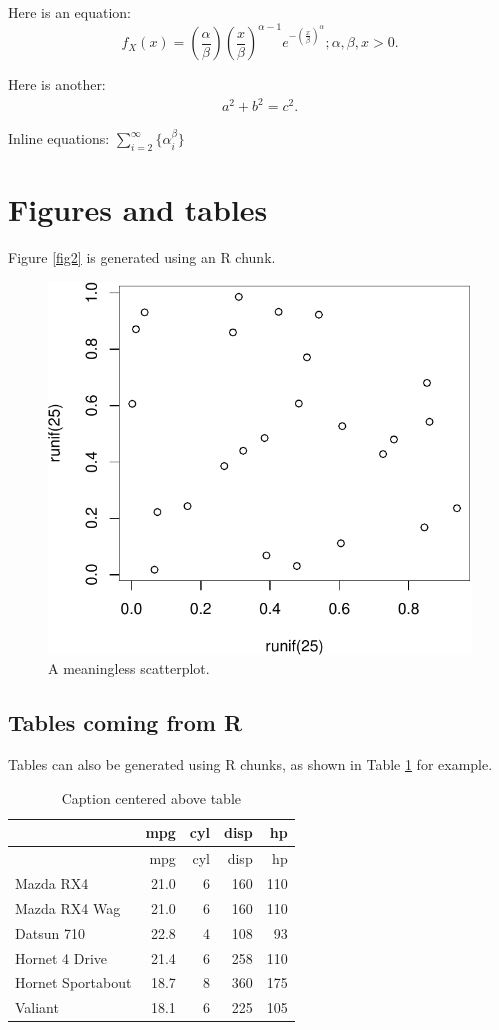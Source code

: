 \documentclass[preprint, 3p,
authoryear]{elsarticle} %
\begin{document}
Here is an equation: \[ 
  f_{X}(x) = \left(\frac{\alpha}{\beta}\right)
  \left(\frac{x}{\beta}\right)^{\alpha-1}
  e^{-\left(\frac{x}{\beta}\right)^{\alpha}}; 
  \alpha,\beta,x > 0 .
\]

Here is another: \begin{align}
  a^2+b^2=c^2.
\end{align}

Inline equations: \(\sum_{i = 2}^\infty\{\alpha_i^\beta\}\)

\hypertarget{figures-and-tables}{%
\section{Figures and tables}\label{figures-and-tables}}

Figure \ref{fig2} is generated using an R chunk.

\begin{figure}

{\centering \includegraphics[width=0.5\linewidth]{Article-template_files/figure-latex/fig2-1} 

}

\caption{\label{fig2}A meaningless scatterplot.}\label{fig:fig2}
\end{figure}

\hypertarget{tables-coming-from-r}{%
\subsection{Tables coming from R}\label{tables-coming-from-r}}

Tables can also be generated using R chunks, as shown in Table
\ref{tab1} for example.

\begin{longtable}[]{@{}lrrrr@{}}
\caption{\label{tab1}Caption centered above table}\tabularnewline
\toprule()
& mpg & cyl & disp & hp \\
\midrule()
\endfirsthead
\toprule()
& mpg & cyl & disp & hp \\
\midrule()
\endhead
Mazda RX4 & 21.0 & 6 & 160 & 110 \\
Mazda RX4 Wag & 21.0 & 6 & 160 & 110 \\
Datsun 710 & 22.8 & 4 & 108 & 93 \\
Hornet 4 Drive & 21.4 & 6 & 258 & 110 \\
Hornet Sportabout & 18.7 & 8 & 360 & 175 \\
Valiant & 18.1 & 6 & 225 & 105 \\
\bottomrule()
\end{longtable}

\renewcommand\refname{References}

\end{document}
